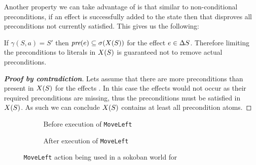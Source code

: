 \documentclass[\master/Master.tex]{subfiles}
\begin{document}
Another property we can take advantage of is that similar to non-conditional preconditions, if an effect is successfully added to the state then that disproves all preconditions not currently satisfied.
This gives us the following:

\begin{theorem}\label{thm:ca:precondition-state}
If $\gamma (S,a) = S'$ then $\textit{pre}(e) \subseteq \sigma(X(S))$  for the effect $e \in \Delta S$.
Therefore limiting the preconditions to literals in $X(S)$ is guaranteed not to remove actual preconditions.
\end{theorem}
\begin{proof}[\textbf{Proof by contradiction}] Lets assume that there are more preconditions than present in $X(S)$ for the effects \geffects.
	In this case the effects would not occur as their required preconditions are missing, thus the preconditions must be satisfied in $X(S)$.
	As such we can conclude $X(S)$ contains at least all precondition atoms.
\end{proof}

\begin{figure}
    \hspace*{0.1\textwidth}%
    \begin{subfigure}{0.35\textwidth}
        \centering
        \resizebox{\linewidth}{!}{}
        \caption{Before execution of \texttt{MoveLeft}}
    \end{subfigure}%
    \hspace*{0.1\textwidth}%
    \begin{subfigure}{0.35\textwidth}
        \centering
        \resizebox{\linewidth}{!}{}
        \caption{After execution of \texttt{MoveLeft}}
    \end{subfigure}
    \hspace*{0.1\textwidth}
	\caption{\label{fig:ca:sokoban-moveleft-action}\texttt{MoveLeft} action being used in a sokoban world for  }

\end{figure}
\end{document}
